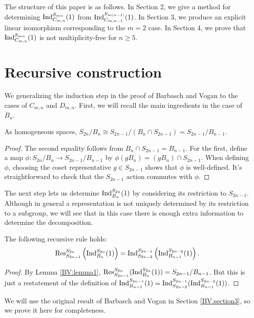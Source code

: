 The structure of this paper is as follows. In Section 2, we give a method for determining $\textup{Ind}_{C_{m,n}}^{S_{mn}}(1)$ from $\textup{Ind}_{C_{m,n-1}}^{S_{m(n-1)}}(1)$. In Section 3, we produce an explicit linear isomorphism corresponding to the $m=2$ case.
In Section 4, we prove that $\textup{Ind}_{C_{m,n}}^{S_{mn}}(1)$ is not multiplicity-free for $n \ge 5$.

\section{Recursive construction}
We generalizing the induction step in the proof of Barbasch and Vogan to the cases of $C_{m,n}$ and $D_{m,n}$.
First, we will recall the main ingredients in the case of $B_n$.

\begin{lemma}\label{BV:lemma1}
As homogeneous spaces, 
$S_{2n}/B_n \cong S_{2n-1}/(B_n \cap S_{2n-1}) = S_{2n-1}/B_{n-1}$.
\end{lemma}
\begin{proof}
The second equality follows from $B_n \cap S_{2n-1} = B_{n-1}$. For the first, define a map $\phi: S_{2n} / B_n \to S_{2n-1}/B_{n-1}$ by $\phi(gB_n) = (gB_n) \cap S_{2n-1}$. When defining $\phi$, choosing the coset representative $g \in S_{2n-1}$ shows that $\phi$ is well-defined. It's straightforward to check that the $S_{2n-1}$ action commutes with $\phi$.
\end{proof}

The next step lets us determine $\textup{Ind}_{B_n}^{S_{2n}}(1)$ by considering its restriction to $S_{2n-1}$. Although in general a representation is not uniquely determined by its restriction to a subgroup, we will see that in this case there is enough extra information to determine the decomposition.

\begin{lemma}\label{BV:lemma2}
The following recursive rule holds:
$$\textup{Res}_{S_{2n-1}}^{S_{2n}}\left(\textup{Ind}_{B_n}^{S_{2n}}(1)\right) = \textup{Ind}_{S_{2n-2}}^{S_{2n-1}}\left(\textup{Ind}_{B_{n-1}}^{S_{2n-2}}(1)\right).$$
\end{lemma}
\begin{proof}
By Lemma \ref{BV:lemma1}, $\textup{Res}_{S_{2n-1}}^{S_{2n}}(\textup{Ind}_{B_n}^{S_{2n}}(1)) = S_{2n-1}/B_{n-1}$. But this is just a restatement
of the definition of $ \textup{Ind}_{B_{n-1}}^{S_{2n-1}} (1) = \textup{Ind}_{S_{2n-2}}^{S_{2n-1}}(\textup{Ind}_{B_{n-1}}^{S_{2n-2}}(1))$.
\end{proof}

We will use the original result of Barbasch and Vogan in Section \ref{BV:section3}, so we prove it here for completeness.

